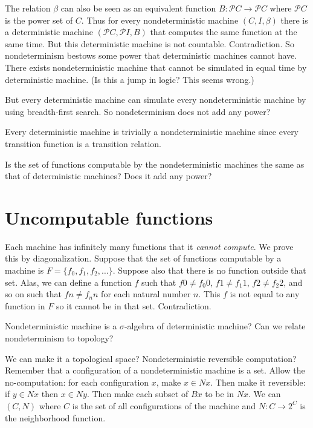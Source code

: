 \documentclass[10pt,statementpaper]{memoir}
\theoremstyle{definition}
\newcommand\powerset{\ensuremath{\mathcal{P}}}
\begin{document}
The relation $\beta$ can also be seen as an equivalent function $B : \powerset C \to \powerset C$
where $\powerset C$ is the power set of $C$.
Thus for every nondeterministic machine $(C, I, \beta)$
there is a deterministic machine $(\powerset C, \powerset I, B)$
that computes the same function at the same time.
But this deterministic machine is not countable.
Contradiction.
So nondeterminism bestows some power that deterministic machines cannot have.
There exists nondeterministic machine that cannot be simulated in equal time by deterministic machine.
(Is this a jump in logic? This seems wrong.)

But every deterministic machine can simulate
every nondeterministic machine by using breadth-first search.
So nondeterminism does not add any power?

Every deterministic machine is trivially a
nondeterministic machine since every transition function is a transition relation.

Is the set of functions computable by the nondeterministic machines
the same as that of deterministic machines?
Does it add any power?

\section{Uncomputable functions}

Each machine has infinitely many functions that it \emph{cannot compute}.
We prove this by diagonalization.
Suppose that the set of functions computable by a machine is $F = \{ f_0, f_1, f_2, \ldots \}$.
Suppose also that there is no function outside that set.
Alas, we can define a function $f$
such that $f0 \neq f_0 0$, $f1 \neq f_1 1$, $f2 \neq f_2 2$, and so on
such that $fn \neq f_n n$ for each natural number $n$.
This $f$ is not equal to any function in $F$ so it cannot be in that set.
Contradiction.

Nondeterministic machine is a $\sigma$-algebra of deterministic machine?
Can we relate nondeterminism to topology?

We can make it a topological space?
Nondeterministic reversible computation?
Remember that a configuration of a nondeterministic machine is a set.
Allow the no-computation: for each configuration $x$, make $x \in N x$.
Then make it reversible:
if $y \in N x$ then $x \in N y$.
Then make each subset of $B x$ to be in $N x$.
We can $(C,N)$ where $C$ is the set of all configurations of the machine
and $N : C \to 2^C$ is the neighborhood function.
\end{document}
